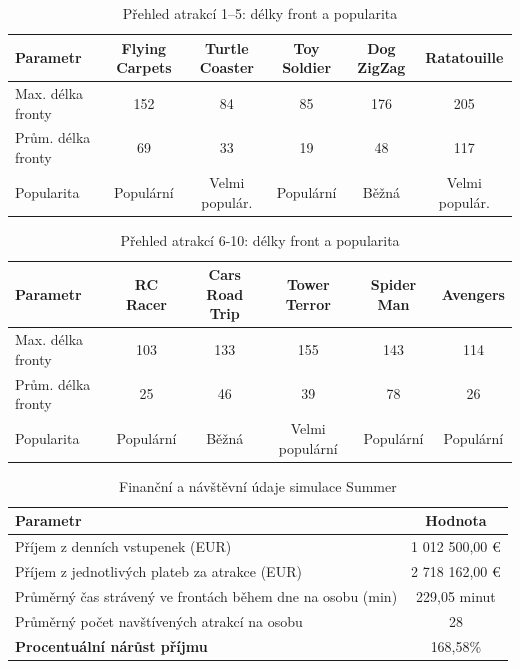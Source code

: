 \documentclass[a4paper,12pt]{article}
\begin{document}
\begin{table}[h!]
	\centering
	\caption{Přehled atrakcí 1–5: délky front a popularita}
	\label{tab:attractions_overview_1_5}
	\begin{tabular}{|l|c|c|c|c|c|}
		\hline
		\textbf{Parametr}&\textbf{Flying Carpets}&\textbf{Turtle Coaster}&\textbf{Toy Soldier}&\textbf{Dog ZigZag}&\textbf{Ratatouille}\\ \hline
		Max. délka fronty   &152                 & 84                 & 85                 & 176                 & 205      \\ \hline
		Prům. délka fronty  &69                 & 33                 & 19                 & 48                 & 117         \\ \hline
		Popularita          &Populární         &Velmi populár.        &Populární          & Běžná          &Velmi populár.\\ \hline
	\end{tabular}
\end{table}
\begin{table}[h!]
	\centering
	\caption{Přehled atrakcí 6-10: délky front a popularita}
	\label{tab:attractions_overview_6_10}
	\begin{tabular}{|l|c|c|c|c|c|}
		\hline
		\textbf{Parametr}   & \textbf{RC  Racer}& \textbf{Cars Road Trip}& \textbf{Tower Terror}& \textbf{Spider Man}& \textbf{Avengers}\\ \hline
		Max. délka fronty   & 103                 & 133                & 155                 & 143               & 114               \\ \hline
		Prům. délka fronty  & 25                & 46                 & 39                & 78                 & 26               \\ \hline
		Popularita          & Populární             & Běžná              & Velmi populární        & Populární          & Populární   \\ \hline
	\end{tabular}
\end{table}


\begin{table}[h!]
	\centering
	\caption{Finanční a návštěvní údaje simulace Summer}
	\label{tab:financial_and_visit_data}
	\begin{tabular}{|l|c|}
		\hline
		\textbf{Parametr}                                         & \textbf{Hodnota} \\ \hline
		Příjem z denních vstupenek (EUR)                          & 1 012 500,00 €   \\ \hline
		Příjem z jednotlivých plateb za atrakce (EUR)             & 2 718 162,00 €   \\ \hline
		Průměrný čas strávený ve frontách během dne na osobu (min) & 229,05 minut     \\ \hline
		Průměrný počet navštívených atrakcí na osobu             & 28               \\ \hline
		\textbf{Procentuální nárůst příjmu}                       & 168,58\%         \\ \hline
	\end{tabular}
\end{table}
\end{document}
